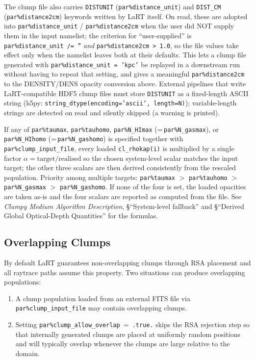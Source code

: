 \documentclass[english,a4paper]{my_memo}
\newcommand{\parm}[1]{\texttt{par\%#1}}
\begin{document}
The clump file also carries \texttt{DISTUNIT} (\parm{distance\_unit}) and
\texttt{DIST\_CM} (\parm{distance2cm}) keywords written by LaRT itself.
On read, these are adopted into \parm{distance\_unit} / \parm{distance2cm}
when the user did NOT supply them in the input namelist; the criterion
for ``user-supplied'' is \parm{distance\_unit}~\texttt{/=~''} \emph{and}
\parm{distance2cm}~\texttt{>~1.0}, so the file values take effect only
when the namelist leaves both at their defaults.  This lets a clump file
generated with \parm{distance\_unit~=~'kpc'} be replayed in a downstream
run without having to repeat that setting, and gives a meaningful
\parm{distance2cm} to the DENSITY/DENS opacity conversion above.
External pipelines that write LaRT-compatible HDF5 clump files must
store \texttt{DISTUNIT} as a fixed-length ASCII string (h5py:
\texttt{string\_dtype(encoding='ascii', length=N)}); variable-length
strings are detected on read and silently skipped (a warning is printed).

If any of \parm{taumax}, \parm{tauhomo}, \parm{N\_HImax}
(=\,\parm{N\_gasmax}), or \parm{N\_HIhomo} (=\,\parm{N\_gashomo}) is
specified together with \parm{clump\_input\_file}, every loaded
\texttt{cl\_rhokap(i)} is multiplied by a single factor
$\alpha = \mathrm{target}/\mathrm{realised}$ so the chosen system-level
scalar matches the input target; the other three scalars are then
derived consistently from the rescaled population.  Priority among
multiple targets: \parm{taumax} $>$ \parm{tauhomo} $>$ \parm{N\_gasmax}
$>$ \parm{N\_gashomo}.  If none of the four is set, the loaded opacities
are taken as-is and the four scalars are reported as computed from the
file.  See \emph{Clumpy Medium Algorithm Description},
\S``System-level fallback'' and
\S``Derived Global Optical-Depth Quantities'' for the formulas.

\subsection{Overlapping Clumps}
\label{sec:clump_overlap}

By default LaRT guarantees non-overlapping clumps through RSA placement and all raytrace
paths assume this property.  Two situations can produce overlapping populations:
\begin{enumerate}
\item A clump population loaded from an external FITS file via \parm{clump\_input\_file}
      may contain overlapping clumps.
\item Setting \parm{clump\_allow\_overlap}~=~\texttt{.true.} skips the RSA rejection step
      so that internally generated clumps are placed at uniformly random positions and will
      typically overlap whenever the clumps are large relative to the domain.
\end{enumerate}
\end{document}
